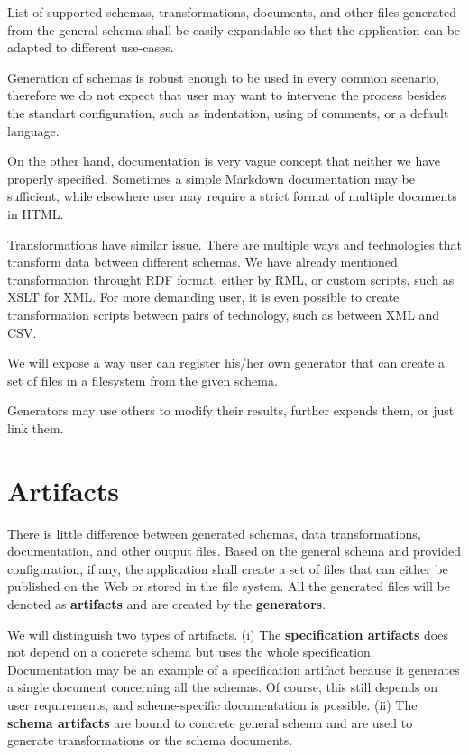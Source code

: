 \begin{requirement}
  List of supported schemas, transformations, documents, and other files generated from the general schema shall be easily expandable so that the application can be adapted to different use-cases.
\end{requirement}

Generation of schemas is robust enough to be used in every common scenario, therefore we do not expect that user may want to intervene the process besides the standart configuration, such as indentation, using of comments, or a default language.

On the other hand, documentation is very vague concept that neither we have properly specified. Sometimes a simple Markdown documentation may be sufficient, while elsewhere user may require a strict format of multiple documents in HTML.

Transformations have similar issue. There are multiple ways and technologies that transform data between different schemas. We have already mentioned transformation throught RDF format, either by RML, or custom scripts, such as XSLT for XML. For more demanding user, it is even possible to create transformation scripts between pairs of technology, such as between XML and CSV.

We will expose a way user can register his/her own generator that can create a set of files in a filesystem from the given schema.

Generators may use others to modify their results, further expends them, or just link them.

\section*{Artifacts}

There is little difference between generated schemas, data transformations, documentation, and other output files. Based on the general schema and provided configuration, if any, the application shall create a set of files that can either be published on the Web or stored in the file system. All the generated files will be denoted as \textbf{artifacts} and are created by the \textbf{generators}.

We will distinguish two types of artifacts. (i) The \textbf{specification artifacts} does not depend on a concrete schema but uses the whole specification. Documentation may be an example of a specification artifact because it generates a single document concerning all the schemas. Of course, this still depends on user requirements, and scheme-specific documentation is possible. (ii) The \textbf{schema artifacts} are bound to concrete general schema and are used to generate transformations or the schema documents.

